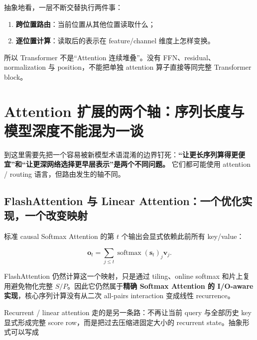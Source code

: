 \documentclass[profile=standard,twoside=false]{ipara-handbook}
\begin{document}
抽象地看，一层不断交替执行两件事：

\begin{enumerate}
  \item \textbf{跨位置路由}：当前位置从其他位置读取什么；
  \item \textbf{逐位置计算}：读取后的表示在 feature/channel 维度上怎样变换。
\end{enumerate}

所以 Transformer 不是“Attention 连续堆叠”。没有 FFN、residual、normalization 与 position，不能把单独 attention 算子直接等同完整 Transformer block。

\section{Attention 扩展的两个轴：序列长度与模型深度不能混为一谈}

到这里需要先把一个容易被新模型术语混淆的边界钉死：\textbf{“让更长序列算得更便宜”和“让更深网络选择更早层表示”是两个不同问题。} 它们都可能使用 attention / routing 语言，但路由发生的轴不同。

\begin{handbookdiagram}
\centering

\end{handbookdiagram}

\subsection{FlashAttention 与 Linear Attention：一个优化实现，一个改变映射}

标准 causal Softmax Attention 的第 $t$ 个输出会显式依赖此前所有 key/value：

$$
\boldsymbol{o}_t
=\sum_{j\le t}
\operatorname{softmax}(\boldsymbol{s}_t)_j\boldsymbol{v}_j.
$$

FlashAttention 仍然计算这一个映射，只是通过 tiling、online softmax 和片上复用避免物化完整 $S/P$。因此它仍然属于\textbf{精确 Softmax Attention 的 I/O-aware 实现}，核心序列计算没有从二次 all-pairs interaction 变成线性 recurrence。

Recurrent / linear attention 走的是另一条路：不再让当前 query 与全部历史 key 显式形成完整 score row，而是把过去压缩进固定大小的 recurrent state。抽象形式可以写成
\end{document}
